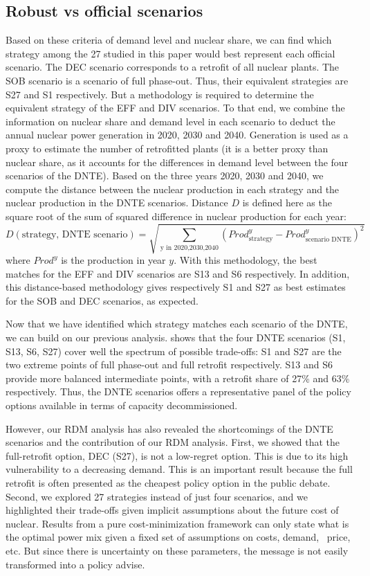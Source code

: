 \subsection{Robust vs official scenarios}
Based on these criteria of demand level and nuclear share, we can find which strategy among the 27 studied in this paper would best represent each official scenario. 
The DEC scenario corresponds to a retrofit of all nuclear plants. The SOB scenario is a scenario of full phase-out. Thus, their equivalent strategies are S27 and S1 respectively. But a methodology is required to determine the equivalent strategy of the EFF and DIV scenarios. 
To that end, we combine the information on nuclear share and demand level in each scenario to deduct the annual nuclear power generation in 2020, 2030 and 2040.
Generation is used as a proxy to estimate the number of retrofitted plants (it is a better proxy than nuclear share, as it accounts for the differences in demand level between the four scenarios of the DNTE). Based on the three years 2020, 2030 and 2040, we compute the distance between the nuclear production in each strategy and the nuclear production in the DNTE scenarios. Distance $D$ is defined here as the square root of the sum of squared difference in nuclear production for each year:
$$D(\text{strategy, DNTE scenario}) = \sqrt{ \sum_{\text{y in {2020,2030,2040}}} (Prod^y_{\text{strategy}} - Prod^y_{\text{scenario DNTE}})^2}$$
where $Prod^y$ is the production in year $y$.
With this methodology, the best matches for the EFF and DIV scenarios are S13 and S6 respectively. In addition, this distance-based methodology gives respectively S1 and S27 as best estimates for the SOB and DEC scenarios, as expected.

Now that we have identified which strategy matches each scenario of the DNTE, we can build on our previous analysis.  shows that the four DNTE scenarios (S1, S13, S6, S27) cover well the spectrum of possible trade-offs: S1 and S27 are the two extreme points of full phase-out and full retrofit respectively. S13 and S6 provide more balanced intermediate points, with a retrofit share of 27\% and 63\% respectively. Thus, the DNTE scenarios offers a representative panel of the policy options available in terms of capacity decommissioned.

However, our RDM analysis has also revealed the shortcomings of the DNTE scenarios and the contribution of our RDM analysis. 
First, we showed that the full-retrofit option, DEC (S27), is not a low-regret option. This is due to its high vulnerability to a decreasing demand. This is an important result because the full retrofit is often presented as the cheapest policy option in the public debate.
Second, we explored 27 strategies instead of just four scenarios, and we highlighted their trade-offs given implicit assumptions about the future cost of nuclear. 
Results from a pure cost-minimization framework can only state what is the optimal power mix given a fixed set of assumptions on costs, demand, \coo\ price, etc. But since there is uncertainty on these parameters, the message is not easily transformed into a policy advise.

